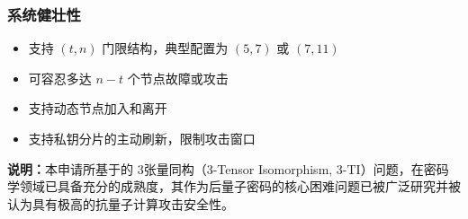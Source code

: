 \subsubsection{系统健壮性}

\begin{itemize}
    \item 支持 $(t, n)$ 门限结构，典型配置为 $(5, 7)$ 或 $(7, 11)$
    \item 可容忍多达 $n - t$ 个节点故障或攻击
    \item 支持动态节点加入和离开
    \item 支持私钥分片的主动刷新，限制攻击窗口
\end{itemize}

\newpage


\textbf{说明：}本申请所基于的 3张量同构（3-Tensor Isomorphism, 3-TI）问题，在密码学领域已具备充分的成熟度，其作为后量子密码的核心困难问题已被广泛研究并被认为具有极高的抗量子计算攻击安全性。
